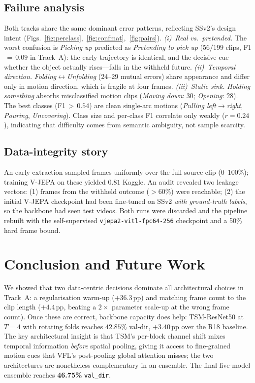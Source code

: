 \documentclass[10pt,twocolumn,letterpaper]{article}
\begin{document}
\subsection{Failure analysis}
\label{sec:failure}

Both tracks share the same dominant error patterns, reflecting SSv2's design
intent (Figs.~\ref{fig:perclass},~\ref{fig:confmat},~\ref{fig:pairs}).
\emph{(i)~Real vs.\ pretended.} The worst confusion is \emph{Picking up}
predicted as \emph{Pretending to pick up} ($56/199$ clips, F1$\,{=}\,0.09$
in Track~A): the early trajectory is identical, and the decisive cue---whether
the object actually rises---falls in the withheld future.
\emph{(ii)~Temporal direction.}
\emph{Folding}$\leftrightarrow$\emph{Unfolding} (24--29 mutual errors) share
appearance and differ only in motion direction, which is fragile at four frames.
\emph{(iii)~Static sink.} \emph{Holding something} absorbs misclassified
motion clips (\emph{Moving down}: 30; \emph{Opening}: 28).
The best classes (F1\,$>\,0.54$) are clean single-arc motions
(\emph{Pulling left$\rightarrow$right}, \emph{Pouring}, \emph{Uncovering}).
Class size and per-class F1 correlate only weakly ($r{=}0.24$), indicating that
difficulty comes from semantic ambiguity, not sample scarcity.

\subsection{Data-integrity story}
\label{sec:integrity}
An early extraction sampled frames uniformly over the full source clip
(0--100\%); training V-JEPA on these yielded $0.81$ Kaggle.
An audit revealed two leakage vectors: (1) frames from the withheld outcome
($>\!60\%$) were reachable; (2) the initial V-JEPA checkpoint had been
fine-tuned on SSv2 \emph{with ground-truth labels}, so the backbone had seen
test videos. Both runs were discarded and the pipeline rebuilt with the
self-supervised \texttt{vjepa2-vitl-fpc64-256} checkpoint and a 50\% hard
frame bound.

\section{Conclusion and Future Work}
\label{sec:conclusion}
We showed that two data-centric decisions dominate all architectural choices in
Track~A: a regularisation warm-up ($+36.3$\,pp) and matching frame count to the
clip length ($+4.4$\,pp, beating a $2\times$ parameter scale-up at the wrong
frame count). Once these are correct, backbone capacity does help: TSM-ResNet50
at $T{=}4$ with rotating folds reaches $42.85\%$ val-dir, $+3.40$\,pp over the
R18 baseline. The key architectural insight is that TSM's per-block channel
shift mixes temporal information \emph{before} spatial pooling, giving it access
to fine-grained motion cues that VFL's post-pooling global attention misses; the
two architectures are nonetheless complementary in an ensemble. The final
five-model ensemble reaches \textbf{46.75\%} \texttt{val\_dir}.
\end{document}
